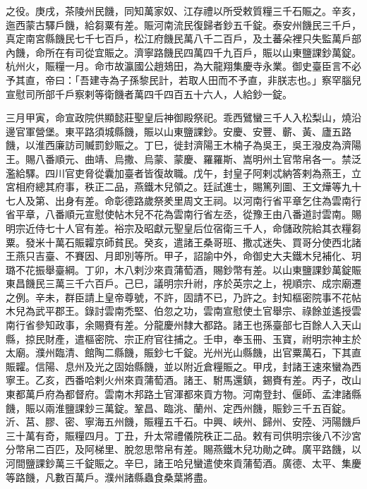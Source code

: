 \begin{pinyinscope}
之役。庚戌，茶陵州民饑，同知萬家奴、江存禮以所受敕質糧三千石賑之。辛亥，迤西蒙古驛戶饑，給芻粟有差。賑河南流民復歸者鈔五千錠。泰安州饑民三千戶，真定南宮縣饑民七千七百戶，松江府饑民萬八千二百戶，及土蕃朵裡只失監萬戶部內饑，命所在有司從宜賑之。濟寧路饑民四萬四千九百戶，賑以山東鹽課鈔萬錠。杭州火，賑糧一月。命市故瀛國公趙鳷田，為大龍翔集慶寺永業。御史臺臣言不必予其直，帝曰：「吾建寺為子孫黎民計，若取人田而不予直，非朕志也。」察罕腦兒宣慰司所部千戶察剌等衛饑者萬四千四百五十六人，人給鈔一錠。



 三月甲寅，命宣政院供顯懿莊聖皇后神御殿祭祀。乖西鷿蠻三千人入松梨山，燒沿邊官軍營堡。東平路須城縣饑，賑以山東鹽課鈔。安慶、安豐、蘄、黃、廬五路饑，以淮西廉訪司贓罰鈔賑之。丁巳，徙封濟陽王木楠子為吳王，吳王潑皮為濟陽王。賜八番順元、曲靖、烏撒、烏蒙、蒙慶、羅羅斯、嵩明州土官幣帛各一。禁泛濫給驛。四川官吏脅從囊加臺者皆復故職。戊午，封皇子阿剌忒納答剌為燕王，立宮相府總其府事，秩正二品，燕鐵木兒領之。廷試進士，賜篤列圖、王文燁等九十七人及第、出身有差。命彰德路歲祭羑里周文王祠。以河南行省平章乞住為雲南行省平章，八番順元宣慰使帖木兒不花為雲南行省左丞，從豫王由八番道討雲南。賜明宗近侍七十人官有差。裕宗及昭獻元聖皇后位宿衛三千人，命儲政院給其衣糧芻粟。發米十萬石賑糶京師貧民。癸亥，遣諸王桑哥班、撒忒迷失、買哥分使西北諸王燕只吉臺、不賽因、月即別等所。甲子，詔諭中外，命御史大夫鐵木兒補化、玥璐不花振舉臺綱。丁卯，木八剌沙來貢蒲萄酒，賜鈔幣有差。以山東鹽課鈔萬錠賑東昌饑民三萬三千六百戶。己巳，議明宗升祔，序於英宗之上，視順宗、成宗廟遷之例。辛未，群臣請上皇帝尊號，不許，固請不已，乃許之。封知樞密院事不花帖木兒為武平郡王。錄討雲南禿堅、伯忽之功，雲南宣慰使土官舉宗、祿餘並遙授雲南行省參知政事，余賜賚有差。分龍慶州隸大都路。諸王也孫臺部七百餘人入天山縣，掠民財產，遣樞密院、宗正府官往捕之。壬申，奉玉冊、玉寶，祔明宗神主於太廟。濮州臨清、館陶二縣饑，賑鈔七千錠。光州光山縣饑，出官粟萬石，下其直賑糶。信陽、息州及光之固始縣饑，並以附近倉糧賑之。甲戌，封諸王速來蠻為西寧王。乙亥，西番哈剌火州來貢蒲萄酒。諸王、駙馬還鎮，錫賚有差。丙子，改山東都萬戶府為都督府。雲南木邦路土官渾都來貢方物。河南登封、偃師、孟津諸縣饑，賑以兩淮鹽課鈔三萬錠。鞏昌、臨洮、蘭州、定西州饑，賑鈔三千五百錠。沂、莒、膠、密、寧海五州饑，賑糧五千石。中興、峽州、歸州、安陸、沔陽饑戶三十萬有奇，賑糧四月。丁丑，升太常禮儀院秩正二品。敕有司供明宗後八不沙宮分幣帛二百匹，及阿梯里、脫忽思幣帛有差。賜燕鐵木兒功勛之碑。廣平路饑，以河間鹽課鈔萬三千錠賑之。辛巳，諸王哈兒蠻遣使來貢蒲萄酒。廣德、太平、集慶等路饑，凡數百萬戶。濮州諸縣蟲食桑葉將盡。




\end{pinyinscope}
